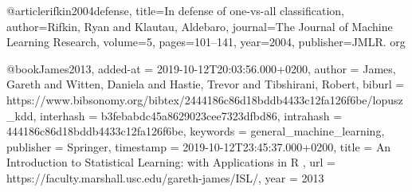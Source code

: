 @article{rifkin2004defense,
title={In defense of one-vs-all classification},
author={Rifkin, Ryan and Klautau, Aldebaro},
journal={The Journal of Machine Learning Research},
volume={5},
pages={101--141},
year={2004},
publisher={JMLR. org}
}

@book{James2013,
  added-at = {2019-10-12T20:03:56.000+0200},
  author = {James, Gareth and Witten, Daniela and Hastie, Trevor and Tibshirani, Robert},
  biburl = {https://www.bibsonomy.org/bibtex/2444186c86d18bddb4433c12fa126f6be/lopusz_kdd},
  interhash = {b3febabdc45a8629023cee7323dfbd86},
  intrahash = {444186c86d18bddb4433c12fa126f6be},
  keywords = {general_machine_learning},
  publisher = {Springer},
  timestamp = {2019-10-12T23:45:37.000+0200},
  title = {An Introduction to Statistical Learning: with Applications in R },
  url = {https://faculty.marshall.usc.edu/gareth-james/ISL/},
  year = 2013
}

